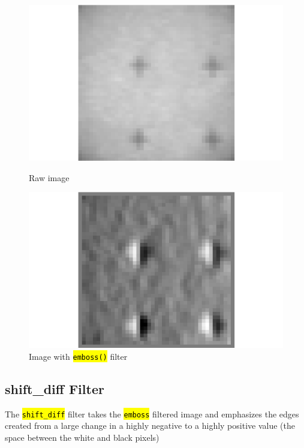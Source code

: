 \documentclass[10pt]{article}
\begin{document}
    \begin{figure}[h]
        \begin{minipage}{0.4\textwidth}
            \begin{center}
            \includegraphics[width=.75\linewidth]{plots_tables_images/untouched.png}
            \caption{Raw image}
            \end{center}
        \end{minipage}
        \begin{minipage}{0.4\textwidth}
            \begin{center}
            \includegraphics[width=.75\linewidth]{plots_tables_images/emboss.png}
            \caption{Image with \hl{\texttt{emboss()}} filter}
            \end{center}
        \end{minipage}
    \end{figure}

    \subsection{shift\_diff Filter}
    \label{sub:shift_diff_filter}
    The \hl{\texttt{shift\_diff}} filter takes the \hl{\texttt{emboss}} filtered image and emphasizes the edges created from a large change in a highly negative to a highly positive value (the space between the white and black pixels)
\end{document}
